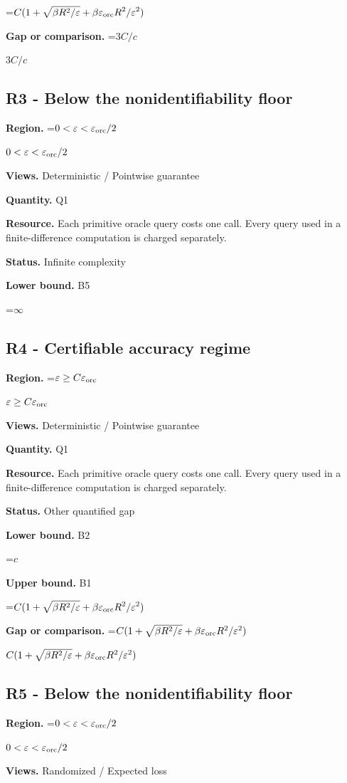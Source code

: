 \documentclass[10pt,a4paper]{article}
\newcommand{\AtlasMath}[1]{\par\begingroup\centering\setbox0=\hbox{$\displaystyle #1$}\ifdim\wd0>1.4\linewidth\typeout{ATLAS WIDE FORMULA: \the\wd0}\fi\ifdim\wd0>\linewidth\resizebox{\linewidth}{!}{\box0}\else\box0\fi\par\endgroup}
\newcommand{\AtlasInlineMath}[1]{\begingroup\setbox0=\hbox{$#1$}\ifdim\wd0>.4\linewidth\endgroup\AtlasMath{#1}\else\endgroup$#1$\fi}
\begin{document}
\AtlasMath{C(1+\sqrt{\beta R^2/\varepsilon}+\beta\varepsilon_{\rm orc}R^2/\varepsilon^2)}
\textbf{Gap or comparison.} \AtlasInlineMath{3C/c}

\subsection{R3 - Below the nonidentifiability floor}
\textbf{Region.} \AtlasInlineMath{0<\varepsilon<\varepsilon_{\rm orc}/2}

\textbf{Views.} Deterministic / Pointwise guarantee

\textbf{Quantity.} Q1

\textbf{Resource.} Each primitive oracle query costs one call. Every query used in a finite-difference computation is charged separately.

\textbf{Status.} Infinite complexity

\textbf{Lower bound.} B5

\AtlasMath{\infty}
\subsection{R4 - Certifiable accuracy regime}
\textbf{Region.} \AtlasInlineMath{\varepsilon\ge C\varepsilon_{\rm orc}}

\textbf{Views.} Deterministic / Pointwise guarantee

\textbf{Quantity.} Q1

\textbf{Resource.} Each primitive oracle query costs one call. Every query used in a finite-difference computation is charged separately.

\textbf{Status.} Other quantified gap

\textbf{Lower bound.} B2

\AtlasMath{c}
\textbf{Upper bound.} B1

\AtlasMath{C(1+\sqrt{\beta R^2/\varepsilon}+\beta\varepsilon_{\rm orc}R^2/\varepsilon^2)}
\textbf{Gap or comparison.} \AtlasInlineMath{C(1+\sqrt{\beta R^2/\varepsilon}+\beta\varepsilon_{\rm orc}R^2/\varepsilon^2)}

\subsection{R5 - Below the nonidentifiability floor}
\textbf{Region.} \AtlasInlineMath{0<\varepsilon<\varepsilon_{\rm orc}/2}

\textbf{Views.} Randomized / Expected loss
\end{document}

